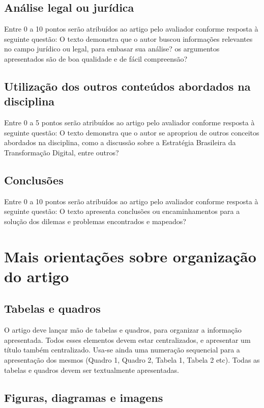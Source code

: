 \documentclass[12pt]{article}
\begin{document}
	\subsection{Análise legal ou jurídica}
	Entre 0 a 10 pontos serão atribuídos ao artigo pelo avaliador conforme resposta à seguinte questão: O texto demonstra que o autor buscou informações relevantes no campo jurídico ou legal, para embasar sua análise? os argumentos apresentados são de boa qualidade e de fácil compreensão?

	\subsection{Utilização dos outros conteúdos abordados na disciplina}
	Entre 0 a 5 pontos serão atribuídos ao artigo pelo avaliador conforme resposta à seguinte questão: O texto demonstra que o autor se apropriou de outros conceitos abordados na disciplina, como a discussão sobre a Estratégia Brasileira da Transformação Digital, entre outros?

	\subsection{Conclusões}
	Entre 0 a 10 pontos serão atribuídos ao artigo pelo avaliador conforme resposta à seguinte questão: O texto apresenta conclusões ou encaminhamentos para a solução dos dilemas e problemas encontrados e mapeados?

	\section{\label{mais:orientacoes}Mais orientações sobre organização do artigo}

	\subsection{Tabelas e quadros}

	O artigo deve lançar mão de tabelas e quadros, para organizar a informação apresentada. Todos esses elementos devem estar centralizados, e apresentar um título também centralizado. Usa-se ainda uma numeração sequencial para a apresentação dos mesmos (Quadro 1, Quadro 2, Tabela 1, Tabela 2 etc). Todas as tabelas e quadros devem ser textualmente apresentadas.

	\subsection{Figuras, diagramas e imagens}
\end{document}
